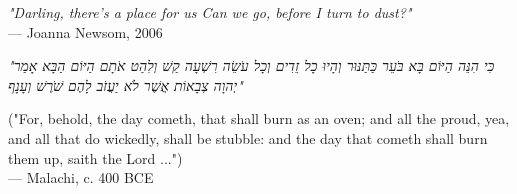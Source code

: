 \begin{flushright}
\emph{"Darling, there's a place for us
Can we go, before I turn to dust?"}\\
— Joanna Newsom, 2006
\end{flushright}

\vspace{2em}

\begin{flushright}
\begin{hebrew}
\emph{"כִּי הִנֵּה הַיּוֹם בָּא בֹּעֵר כַּתַּנּוּר וְהָיוּ כָל זֵדִים וְכָל עֹשֵׂה רִשְׁעָה קַשׁ וְלִהַט אֹתָם הַיּוֹם הַבָּא אָמַר יְהוָה צְבָאוֹת אֲשֶׁר לֹא יַעֲזֹב לָהֶם שֹׁרֶשׁ וְעָנָף"} \\
\end{hebrew}
("For, behold, the day cometh, that shall burn as an oven; and all the proud, yea, and all that do wickedly, shall be stubble: and the day that cometh shall burn them up, saith the Lord ...") \\
— Malachi, c. 400 BCE
\end{flushright}
